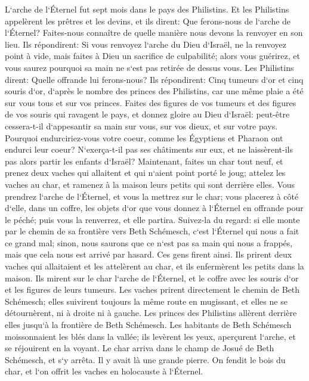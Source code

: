 \verse L`arche de l`Éternel fut sept mois dans le pays des Philistins. 
\verse Et les Philistins appelèrent les prêtres et les devins, et ils dirent: Que ferons-nous de l`arche de l`Éternel? Faites-nous connaître de quelle manière nous devons la renvoyer en son lieu. 
\verse Ils répondirent: Si vous renvoyez l`arche du Dieu d`Israël, ne la renvoyez point à vide, mais faites à Dieu un sacrifice de culpabilité; alors vous guérirez, et vous saurez pourquoi sa main ne s`est pas retirée de dessus vous. 
\verse Les Philistins dirent: Quelle offrande lui ferons-nous? Ils répondirent: Cinq tumeurs d`or et cinq souris d`or, d`après le nombre des princes des Philistins, car une même plaie a été sur vous tous et sur vos princes. 
\verse Faites des figures de vos tumeurs et des figures de vos souris qui ravagent le pays, et donnez gloire au Dieu d`Israël: peut-être cessera-t-il d`appesantir sa main sur vous, sur vos dieux, et sur votre pays. 
\verse Pourquoi endurciriez-vous votre coeur, comme les Égyptiens et Pharaon ont endurci leur coeur? N`exerça-t-il pas ses châtiments sur eux, et ne laissèrent-ils pas alors partir les enfants d`Israël? 
\verse Maintenant, faites un char tout neuf, et prenez deux vaches qui allaitent et qui n`aient point porté le joug; attelez les vaches au char, et ramenez à la maison leurs petits qui sont derrière elles. 
\verse Vous prendrez l`arche de l`Éternel, et vous la mettrez sur le char; vous placerez à côté d`elle, dans un coffre, les objets d`or que vous donnez à l`Éternel en offrande pour le péché; puis vous la renverrez, et elle partira. 
\verse Suivez-la du regard: si elle monte par le chemin de sa frontière vers Beth Schémesch, c`est l`Éternel qui nous a fait ce grand mal; sinon, nous saurons que ce n`est pas sa main qui nous a frappés, mais que cela nous est arrivé par hasard. 
\verse Ces gens firent ainsi. Ils prirent deux vaches qui allaitaient et les attelèrent au char, et ils enfermèrent les petits dans la maison. 
\verse Ils mirent sur le char l`arche de l`Éternel, et le coffre avec les souris d`or et les figures de leurs tumeurs. 
\verse Les vaches prirent directement le chemin de Beth Schémesch; elles suivirent toujours la même route en mugissant, et elles ne se détournèrent, ni à droite ni à gauche. Les princes des Philistins allèrent derrière elles jusqu`à la frontière de Beth Schémesch. 
\verse Les habitants de Beth Schémesch moissonnaient les blés dans la vallée; ils levèrent les yeux, aperçurent l`arche, et se réjouirent en la voyant. 
\verse Le char arriva dans le champ de Josué de Beth Schémesch, et s`y arrêta. Il y avait là une grande pierre. On fendit le bois du char, et l`on offrit les vaches en holocauste à l`Éternel. 

